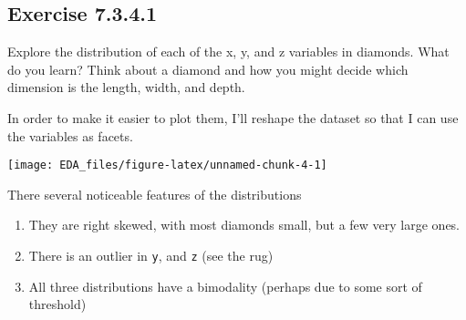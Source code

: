\documentclass[]{book}
\newenvironment{Shaded}{\begin{snugshade}}{\end{snugshade}}
\newcommand{\DataTypeTok}[1]{\textcolor[rgb]{0.13,0.29,0.53}{#1}}
\newcommand{\KeywordTok}[1]{\textcolor[rgb]{0.13,0.29,0.53}{\textbf{#1}}}
\newcommand{\NormalTok}[1]{#1}
\newcommand{\OperatorTok}[1]{\textcolor[rgb]{0.81,0.36,0.00}{\textbf{#1}}}
\newcommand{\StringTok}[1]{\textcolor[rgb]{0.31,0.60,0.02}{#1}}
\providecommand{\tightlist}{%
  \setlength{\itemsep}{0pt}\setlength{\parskip}{0pt}}
\theoremstyle{plain}
\theoremstyle{remark}
\begin{document}
\hypertarget{exercise-7.3.4.1}{%
\subsection*{\texorpdfstring{Exercise
{7.3.4.1}}{Exercise 7.3.4.1}}\label{exercise-7.3.4.1}}

Explore the distribution of each of the x, y, and z variables in
diamonds. What do you learn? Think about a diamond and how you might
decide which dimension is the length, width, and depth.

In order to make it easier to plot them, I'll reshape the dataset so
that I can use the variables as facets.

\begin{Shaded}
\end{Shaded}

\begin{center}\texttt{[image: EDA\_files/figure-latex/unnamed-chunk-4-1]} \end{center}

There several noticeable features of the distributions

\begin{enumerate}
\def\labelenumi{\arabic{enumi}.}
\tightlist
\item
  They are right skewed, with most diamonds small, but a few very large
  ones.
\item
  There is an outlier in \texttt{y}, and \texttt{z} (see the rug)
\item
  All three distributions have a bimodality (perhaps due to some sort of
  threshold)
\end{enumerate}
\end{document}
